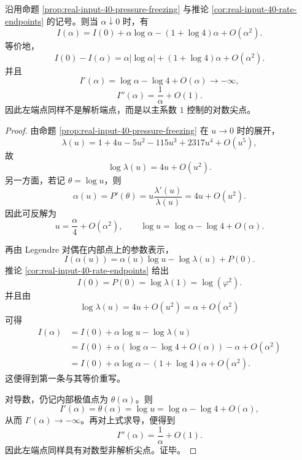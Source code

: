 \begin{theorem}\label{thm:xi-output-potential-rate-left-endpoint-cramer-lambert}
沿用命题 \ref{prop:real-input-40-pressure-freezing} 与推论 \ref{cor:real-input-40-rate-endpoints} 的记号。则当 \(\alpha\downarrow 0\) 时，有
\[
\boxed{\;
I(\alpha)
=
I(0)+\alpha\log\alpha-(1+\log 4)\alpha+O(\alpha^2).\;}
\]
等价地，
\[
\boxed{\;
I(0)-I(\alpha)
=
\alpha|\log\alpha|+(1+\log 4)\alpha+O(\alpha^2).\;}
\]
并且
\[
\boxed{\;
I'(\alpha)=\log\alpha-\log4+O(\alpha)\to-\infty,\;}
\]
\[
\boxed{\;
I''(\alpha)=\frac1\alpha+O(1).\;}
\]
因此左端点同样不是解析端点，而是以主系数 \(1\) 控制的对数尖点。
\end{theorem}
\begin{proof}
由命题 \ref{prop:real-input-40-pressure-freezing} 在 \(u\to 0\) 时的展开，
\[
\lambda(u)=1+4u-5u^2-115u^3+2317u^4+O(u^5),
\]
故
\[
\log\lambda(u)=4u+O(u^2).
\]
另一方面，若记 \(\theta=\log u\)，则
\[
\alpha(u)=P'(\theta)=u\frac{\lambda'(u)}{\lambda(u)}=4u+O(u^2).
\]
因此可反解为
\[
u=\frac{\alpha}{4}+O(\alpha^2),
\qquad
\log u=\log\alpha-\log4+O(\alpha).
\]

再由 Legendre 对偶在内部点上的参数表示，
\[
I(\alpha(u))=\alpha(u)\log u-\log\lambda(u)+P(0).
\]
推论 \ref{cor:real-input-40-rate-endpoints} 给出
\[
I(0)=P(0)=\log\lambda(1)=\log(\varphi^2).
\]
并且由
\[
\log\lambda(u)=4u+O(u^2)=\alpha+O(\alpha^2)
\]
可得
\[
\begin{aligned}
I(\alpha)
&=
I(0)+\alpha\log u-\log\lambda(u)\\
&=
I(0)+\alpha(\log\alpha-\log4+O(\alpha))-\alpha+O(\alpha^2)\\
&=
I(0)+\alpha\log\alpha-(1+\log4)\alpha+O(\alpha^2).
\end{aligned}
\]
这便得到第一条与其等价重写。

对导数，仍记内部极值点为 \(\theta(\alpha)\)。则
\[
I'(\alpha)=\theta(\alpha)=\log u=\log\alpha-\log4+O(\alpha),
\]
从而 \(I'(\alpha)\to-\infty\)。再对上式求导，便得到
\[
I''(\alpha)=\frac1\alpha+O(1).
\]
因此左端点同样具有对数型非解析尖点。证毕。
\end{proof}

